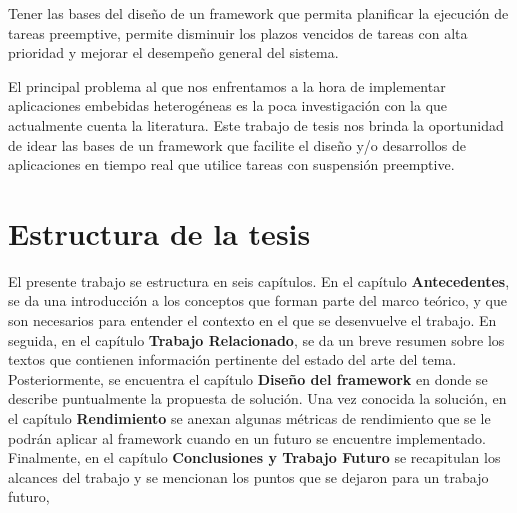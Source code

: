 Tener las bases del diseño de un framework que permita planificar la ejecución de tareas preemptive, permite disminuir los plazos vencidos de tareas con alta prioridad y mejorar el desempeño general del sistema.
\newline

El principal problema al que nos enfrentamos a la hora de implementar aplicaciones embebidas heterogéneas es la poca investigación con la que actualmente cuenta la literatura. Este trabajo de tesis nos brinda la oportunidad de idear las bases de un framework que facilite el diseño y/o desarrollos de aplicaciones en tiempo real que utilice tareas con suspensión preemptive.

\section {Estructura de la tesis}

El presente trabajo se estructura en seis capítulos.
En el capítulo \textbf{Antecedentes}, se da una introducción a los conceptos que forman parte del marco teórico, y que son necesarios para entender el contexto en el que se desenvuelve el trabajo. En seguida, en el capítulo \textbf{Trabajo Relacionado}, se da un breve resumen sobre los textos que contienen información pertinente del estado del arte del tema. Posteriormente, se encuentra el capítulo \textbf{Diseño del framework} en donde se describe puntualmente la propuesta de solución. Una vez conocida la solución, en el capítulo \textbf{Rendimiento} se anexan algunas métricas de rendimiento que se le podrán aplicar al framework cuando en un futuro se encuentre implementado. Finalmente, en el capítulo \textbf{Conclusiones y Trabajo Futuro} se recapitulan los alcances del trabajo y se mencionan los puntos que se dejaron para un trabajo futuro,

